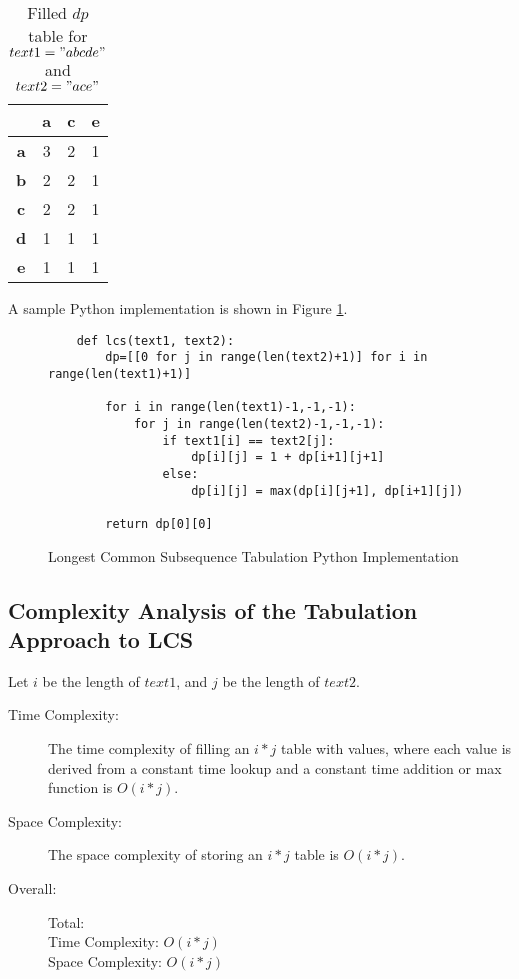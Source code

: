\begin{table}[htbp]
    \centering
    \begin{tabular}{|c|c|c|c|}
        \hline
          & \textbf{a} & \textbf{c} & \textbf{e} \\
        \hline
        \textbf{a} & 3 & 2 & 1 \\
        \hline
        \textbf{b} & 2 & 2 & 1  \\
        \hline
        \textbf{c} & 2 & 2 & 1  \\
        \hline
        \textbf{d} & 1 & 1 & 1 \\
        \hline
        \textbf{e} & 1 & 1 & 1  \\
        \hline
    \end{tabular}
    \label{tab:lcs-dp-table}
    \caption{Filled $dp$ table for $text1="abcde"$ and $text2="ace"$}
\end{table}


A sample Python implementation is shown in Figure \ref{fig:lcs-dp}.

\begin{figure}[H]
    \centering
    \begin{lstlisting}
    def lcs(text1, text2):
        dp=[[0 for j in range(len(text2)+1)] for i in range(len(text1)+1)]
    
        for i in range(len(text1)-1,-1,-1):
            for j in range(len(text2)-1,-1,-1):
                if text1[i] == text2[j]:
                    dp[i][j] = 1 + dp[i+1][j+1]
                else:
                    dp[i][j] = max(dp[i][j+1], dp[i+1][j])
    
        return dp[0][0]
    \end{lstlisting}
    \caption{Longest Common Subsequence Tabulation Python Implementation}
    \label{fig:lcs-dp}
\end{figure}

\subsection{Complexity Analysis of the Tabulation Approach to LCS}\label{subsec:ca-lcs-dp}

Let $i$ be the length of $text1$, and $j$ be the length of $text2$.

\begin{description}
    \item[Time Complexity:]
        The time complexity of filling an $i * j$ table with values, where each value is derived from a constant time lookup and a constant time addition or max function is $O(i * j)$.

    \item[Space Complexity:] 
        The space complexity of storing an $i * j$ table is $O(i * j)$.

        
    \item[Overall:] Total:\\
        Time Complexity: $O(i * j)$\\
        Space Complexity: $O(i * j)$
    
\end{description}

